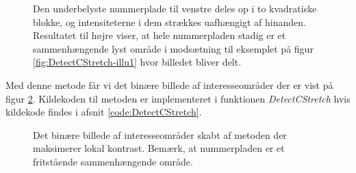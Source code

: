 \begin{figure}[htbp]
  \centering
  \begin{minipage}[b]{5 cm}
  \end{minipage}
  \begin{minipage}[b]{5 cm}
  \end{minipage}
  \caption{Den underbelyste nummerplade til venstre deles op i to kvadratiske blokke, og intensiteterne i dem strækkes uafhængigt af hinanden. Resultatet til højre viser, at hele nummerpladen stadig er et sammenhængende lyst område i modsætning til eksemplet på figur \vref{fig:DetectCStretch-illu1} hvor billedet bliver delt.}
  \label{fig:DetectCStretch-illu2}
\end{figure}

Med denne metode får vi det binære billede af interesseområder der er vist på figur \ref{fig:DetectCStretch-binary}. Kildekoden til metoden er implementeret i funktionen \textit{DetectCStretch} hvis kildekode findes i afsnit \vref{code:DetectCStretch}.

\begin{figure}[htp]
  \centering
  \caption{Det binære billede af interesseområder skabt af metoden der maksimerer lokal kontrast. Bemærk, at nummerpladen er et fritstående sammenhængende område.}
  \label{fig:DetectCStretch-binary}
\end{figure}

